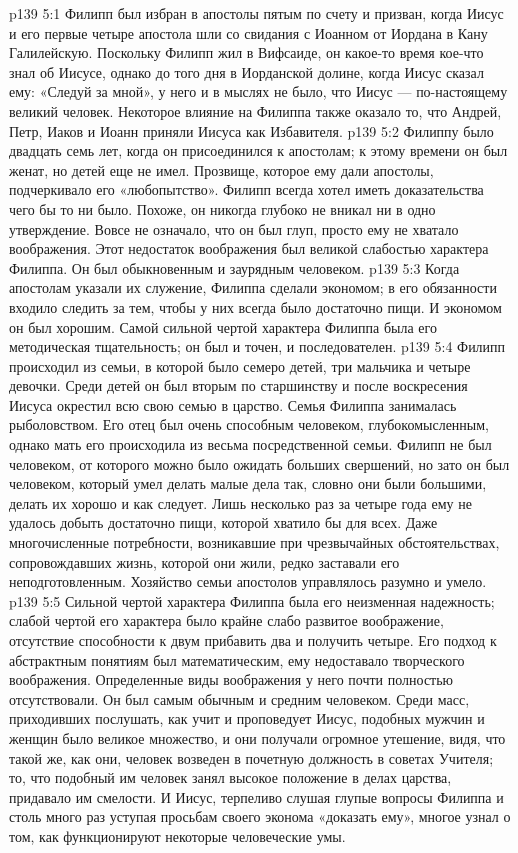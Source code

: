 \vs p139 5:1 Филипп был избран в апостолы пятым по счету и призван, когда Иисус и его первые четыре апостола шли со свидания с Иоанном от Иордана в Кану Галилейскую. Поскольку Филипп жил в Вифсаиде, он какое\hyp{}то время кое\hyp{}что знал об Иисусе, однако до того дня в Иорданской долине, когда Иисус сказал ему: «Следуй за мной», у него и в мыслях не было, что Иисус --- по\hyp{}настоящему великий человек. Некоторое влияние на Филиппа также оказало то, что Андрей, Петр, Иаков и Иоанн приняли Иисуса как Избавителя.
\vs p139 5:2 Филиппу было двадцать семь лет, когда он присоединился к апостолам; к этому времени он был женат, но детей еще не имел. Прозвище, которое ему дали апостолы, подчеркивало его «любопытство». Филипп всегда хотел иметь доказательства чего бы то ни было. Похоже, он никогда глубоко не вникал ни в одно утверждение. Вовсе не означало, что он был глуп, просто ему не хватало воображения. Этот недостаток воображения был великой слабостью характера Филиппа. Он был обыкновенным и заурядным человеком.
\vs p139 5:3 \pc Когда апостолам указали их служение, Филиппа сделали экономом; в его обязанности входило следить за тем, чтобы у них всегда было достаточно пищи. И экономом он был хорошим. Самой сильной чертой характера Филиппа была его методическая тщательность; он был и точен, и последователен.
\vs p139 5:4 Филипп происходил из семьи, в которой было семеро детей, три мальчика и четыре девочки. Среди детей он был вторым по старшинству и после воскресения Иисуса окрестил всю свою семью в царство. Семья Филиппа занималась рыболовством. Его отец был очень способным человеком, глубокомысленным, однако мать его происходила из весьма посредственной семьи. Филипп не был человеком, от которого можно было ожидать больших свершений, но зато он был человеком, который умел делать малые дела так, словно они были большими, делать их хорошо и как следует. Лишь несколько раз за четыре года ему не удалось добыть достаточно пищи, которой хватило бы для всех. Даже многочисленные потребности, возникавшие при чрезвычайных обстоятельствах, сопровождавших жизнь, которой они жили, редко заставали его неподготовленным. Хозяйство семьи апостолов управлялось разумно и умело.
\vs p139 5:5 Сильной чертой характера Филиппа была его неизменная надежность; слабой чертой его характера было крайне слабо развитое воображение, отсутствие способности к двум прибавить два и получить четыре. Его подход к абстрактным понятиям был математическим, ему недоставало творческого воображения. Определенные виды воображения у него почти полностью отсутствовали. Он был самым обычным и средним человеком. Среди масс, приходивших послушать, как учит и проповедует Иисус, подобных мужчин и женщин было великое множество, и они получали огромное утешение, видя, что такой же, как они, человек возведен в почетную должность в советах Учителя; то, что подобный им человек занял высокое положение в делах царства, придавало им смелости. И Иисус, терпеливо слушая глупые вопросы Филиппа и столь много раз уступая просьбам своего эконома «доказать ему», многое узнал о том, как функционируют некоторые человеческие умы.
